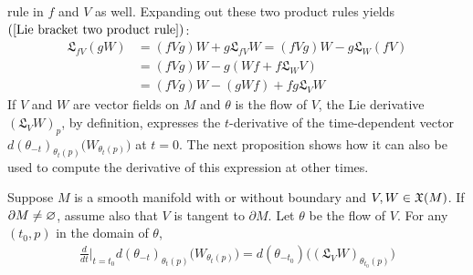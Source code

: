 rule in $f$ and $V$ as well. Expanding out these two product rules yields $(\ref{Lie bracket two product rule})$:
\begin{align*}
\mathfrak{L}_{fV}(gW)&=(fVg)W+g\mathfrak{L}_{fV}W=(fVg)W-g\mathfrak{L}_{W}(fV)\\
&=(fVg)W-g(Wf+f\mathfrak{L}_{W}V)\\
&=(fVg)W-(gWf)+fg\mathfrak{L}_VW
\end{align*}
If $V$ and $W$ are vector fields on $M$ and $\theta$ is the flow of $V$, the Lie derivative $(\mathfrak{L}_VW)_p$, by definition, expresses the $t$-derivative of the time-dependent vector $d(\theta_{-t})_{\theta_t(p)}\big(W_{\theta_t(p)}\big)$ at $t=0$. The next proposition shows how it can also be used to compute the derivative of this expression at other times.
\begin{proposition}\label{Lie derivative t_0}
Suppose $M$ is a smooth manifold with or without boundary and $V,W\in\mathfrak{X}(M)$. If $\partial M\neq\varnothing$, assume also that $V$ is tangent to $\partial M$. Let $\theta$ be the flow of $V$. For any $(t_0,p)$ in the domain of $\theta$,
\begin{align*}
\frac{d}{dt}\Big|_{t=t_0}d(\theta_{-t})_{\theta_t(p)}\big(W_{\theta_t(p)}\big)=d(\theta_{-t_0})\big((\mathfrak{L}_VW)_{\theta_{t_0}(p)}\big)
\end{align*}
\end{proposition}

